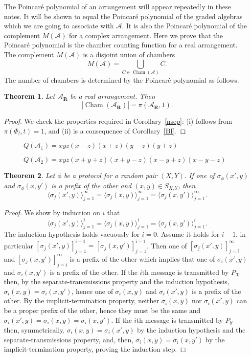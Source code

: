 \documentclass{article}
\newtheorem{thm}{Theorem}[section]
\theoremstyle{definition}
\theoremstyle{remark}
\newcommand{\A}{\mathcal{A}}
\newcommand{\st}{\sigma}
\newcommand{\XcY}{{(X,Y)}}
\newcommand{\SXY}{{S_{X,Y}}}
\newcommand{\PY}{{P_{\mathcal{Y}}}}
\newcommand{\X}{\mathcal{X}}
\DeclareMathOperator{\Cham}{Cham}
\newcommand{\envert}[1]{\left\lvert#1\right\rvert}
\let\abs=\envert
\begin{document}
The Poincar\'e polynomial of an arrangement
will appear repeatedly
in these notes. It will be shown to equal the
Poincar\'e polynomial
of the graded algebras which we are going to
associate with $\A$. It is also the Poincar\'e
polynomial of the complement $M(\A)$ for a
complex arrangement. Here we prove
that the Poincar\'e polynomial is the chamber
counting function for a real arrangement. The
complement $M(\A)$ is a disjoint union of chambers
\[M(\A) = \bigcup_{C \in \Cham(\A)} C.\]
The number
of chambers is determined by the Poincar\'e
polynomial as follows.

\begin{thm}\label{th-realarr}
Let $\A_{\symbf{R}}$ be a real arrangement. Then
\[ \abs{\Cham(\A_{\symbf{R}})} = \pi (\A_{\symbf{R}},1). \]
\end{thm}

\begin{proof}
We check the properties required in Corollary~\ref{nsep}:
(i) follows from $\pi (\Phi_{ l},t) = 1$, and (ii) is a
consequence of Corollary~\ref{BI}.
\end{proof}

\begin{figure}
\vspace{5cm}
\caption[]{$Q(\A_{1}) = xyz(x-z)(x+z)(y-z)(y+z)$}
\end{figure}

\begin{figure}
\vspace{5cm}
\caption[]{$Q(\A_{2})= xyz(x+y+z)(x+y-z)(x-y+z)(x-y-z)$}
\end{figure}


\begin{thm}
\label{T_first_the_int}
Let $\phi$ be a protocol for a random pair $\XcY$.
If one of $\st_\phi(x',y)$ and $\st_\phi(x,y')$ is a prefix of the other
and $(x,y)\in\SXY$, then
\[
\langle \st_j(x',y)\rangle_{j=1}^\infty
=\langle \st_j(x,y)\rangle_{j=1}^\infty
=\langle \st_j(x,y')\rangle_{j=1}^\infty .
\]
\end{thm}
\begin{proof}
We show by induction on $i$ that
\[
\langle \st_j(x',y)\rangle_{j=1}^i
=\langle \st_j(x,y)\rangle_{j=1}^i
=\langle \st_j(x,y')\rangle_{j=1}^i.
\]
The induction hypothesis holds vacuously for $i=0$. Assume it holds for
$i-1$, in particular
$[\st_j(x',y)]_{j=1}^{i-1}=[\st_j(x,y')]_{j=1}^{i-1}$. Then one of
$[\st_j(x',y)]_{j=i}^{\infty}$ and $[\st_j(x,y')]_{j=i}^{\infty}$ is a
prefix of the other which implies that one of $\st_i(x',y)$ and
$\st_i(x,y')$ is a prefix of the other. If the $i$th message is
transmitted by $P_\X$ then, by the separate-transmissions property and
the induction hypothesis, $\st_i(x,y)=\st_i(x,y')$, hence one of
$\st_i(x,y)$ and $\st_i(x',y)$ is a prefix of the other. By the
implicit-termination property, neither $\st_i(x,y)$ nor $\st_i(x',y)$
can be a proper prefix of the other, hence they must be the same and
$\st_i(x',y)=\st_i(x,y)=\st_i(x,y')$. If the $i$th message is
transmitted by $\PY$ then, symmetrically, $\st_i(x,y)=\st_i(x',y)$ by
the induction hypothesis and the separate-transmissions property, and,
then, $\st_i(x,y)=\st_i(x,y')$ by the implicit-termination property,
proving the induction step.
\end{proof}
\end{document}
